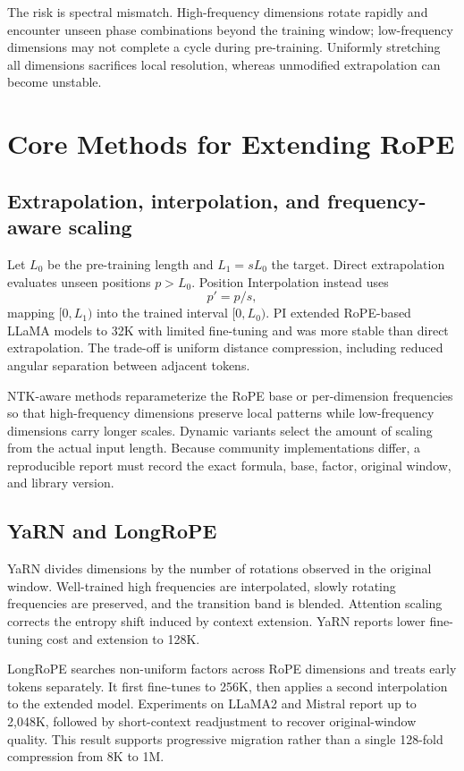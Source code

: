 \documentclass[UTF8,10pt,a4paper,fontset=none]{ctexart}
\begin{document}
The risk is spectral mismatch. High-frequency dimensions rotate rapidly and encounter unseen phase combinations beyond the training window; low-frequency dimensions may not complete a cycle during pre-training. Uniformly stretching all dimensions sacrifices local resolution, whereas unmodified extrapolation can become unstable.

\section{Core Methods for Extending RoPE}

\subsection{Extrapolation, interpolation, and frequency-aware scaling}
Let $L_0$ be the pre-training length and $L_1=sL_0$ the target. Direct extrapolation evaluates unseen positions $p>L_0$. Position Interpolation instead uses
\begin{equation}p'=p/s,
\end{equation}
mapping $[0,L_1)$ into the trained interval $[0,L_0)$. PI extended RoPE-based LLaMA models to 32K with limited fine-tuning and was more stable than direct extrapolation\cite{chen2023pi}. The trade-off is uniform distance compression, including reduced angular separation between adjacent tokens.

NTK-aware methods reparameterize the RoPE base or per-dimension frequencies so that high-frequency dimensions preserve local patterns while low-frequency dimensions carry longer scales. Dynamic variants select the amount of scaling from the actual input length. Because community implementations differ, a reproducible report must record the exact formula, base, factor, original window, and library version.

\subsection{YaRN and LongRoPE}
YaRN divides dimensions by the number of rotations observed in the original window. Well-trained high frequencies are interpolated, slowly rotating frequencies are preserved, and the transition band is blended. Attention scaling corrects the entropy shift induced by context extension. YaRN reports lower fine-tuning cost and extension to 128K\cite{peng2023yarn}.

LongRoPE searches non-uniform factors across RoPE dimensions and treats early tokens separately. It first fine-tunes to 256K, then applies a second interpolation to the extended model. Experiments on LLaMA2 and Mistral report up to 2,048K, followed by short-context readjustment to recover original-window quality\cite{ding2024longrope}. This result supports progressive migration rather than a single 128-fold compression from 8K to 1M.
\end{document}
